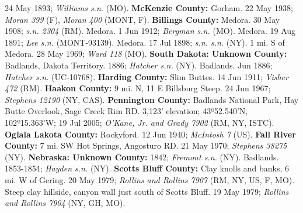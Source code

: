 24 May 1893; \textit{Williams s.n.} (MO).
  \textbf{McKenzie County:}
Gorham. 22 May 1938; \textit{Moran 399} (F), \textit{Moran 400} (MONT, F).
  \textbf{Billings County:}
Medora. 30 May 1908; \textit{s.n. 2304} (RM).
Medora. 1 Jun 1912; \textit{Bergman s.n.} (MO).
Medora. 19 Aug 1891; \textit{Lee s.n.} (MONT-93139).
Medora. 17 Jul 1898; \textit{s.n. s.n.} (NY).
1 mi. S of Medora. 28 May 1969; \textit{Ward 118} (MO).
  \textbf{South Dakota: Unknown County:}
Badlands, Dakota Territory. 1886; \textit{Hatcher s.n.} (NY).
Badlands. Jun 1886; \textit{Hatcher s.n.} (UC-10768).
  \textbf{Harding County:}
Slim Buttes. 14 Jun 1911; \textit{Visher 472} (RM).
  \textbf{Haakon County:}
9 mi. N, 11 E Billsburg Steep. 24 Jun 1967; \textit{Stephens 12190} (NY, CAS).
  \textbf{Pennington County:}
Badlands National Park, Hay Butte Overlook, Sage Creek Rim RD.
3,123' elevation; 43º52.540'N, 102º15.363'W; 19 Jul 2005;
\textit{O'Kane, Jr. and Grady 7902} (RM, NY, ISTC).
  \textbf{Oglala Lakota County:}
Rockyford. 12 Jun 1940; \textit{McIntosh 7} (US).
  \textbf{Fall River County:}
7 mi. SW Hot Springs, Angosturo RD. 21 May 1970; \textit{Stephens 38275} (NY).
  \textbf{Nebraska: Unknown County:}
1842; \textit{Fremont s.n.} (NY).
Badlands. 1853-1854; \textit{Hayden s.n.} (NY).
  \textbf{Scotts Bluff County:}
Clay knolls and banks, 6 mi. W of Gering. 20 May 1979;
\textit{Rollins and Rollins 7907} (RM, NY, US, F, MO).
Steep clay hillside, canyon wall just south of Scotts Bluff. 19 May 1979;
\textit{Rollins and Rollins 7904} (NY, GH, MO).

